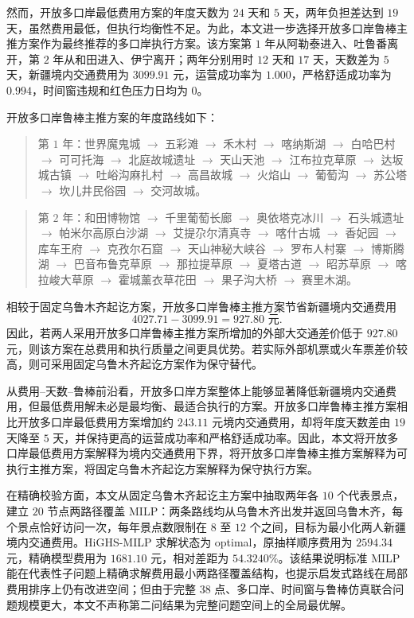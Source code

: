 \documentclass[UTF8,zihao=-4,a4paper]{ctexart}
\begin{document}
然而，开放多口岸最低费用方案的年度天数为 $24$ 天和 $5$ 天，两年负担差达到 $19$ 天，虽然费用最低，但执行均衡性不足。为此，本文进一步选择开放多口岸鲁棒主推方案作为最终推荐的多口岸执行方案。该方案第 $1$ 年从阿勒泰进入、吐鲁番离开，第 $2$ 年从和田进入、伊宁离开；两年分别用时 $12$ 天和 $17$ 天，天数差为 $5$ 天，新疆境内交通费用为 $3099.91$ 元，运营成功率为 $1.000$，严格舒适成功率为 $0.994$，时间窗违规和红色压力日均为 $0$。

开放多口岸鲁棒主推方案的年度路线如下：
\begin{quote}
\small
第 $1$ 年：世界魔鬼城 $\rightarrow$ 五彩滩 $\rightarrow$ 禾木村 $\rightarrow$ 喀纳斯湖 $\rightarrow$ 白哈巴村 $\rightarrow$ 可可托海 $\rightarrow$ 北庭故城遗址 $\rightarrow$ 天山天池 $\rightarrow$ 江布拉克草原 $\rightarrow$ 达坂城古镇 $\rightarrow$ 吐峪沟麻扎村 $\rightarrow$ 高昌故城 $\rightarrow$ 火焰山 $\rightarrow$ 葡萄沟 $\rightarrow$ 苏公塔 $\rightarrow$ 坎儿井民俗园 $\rightarrow$ 交河故城。
\end{quote}
\begin{quote}
\small
第 $2$ 年：和田博物馆 $\rightarrow$ 千里葡萄长廊 $\rightarrow$ 奥依塔克冰川 $\rightarrow$ 石头城遗址 $\rightarrow$ 帕米尔高原白沙湖 $\rightarrow$ 艾提尕尔清真寺 $\rightarrow$ 喀什古城 $\rightarrow$ 香妃园 $\rightarrow$ 库车王府 $\rightarrow$ 克孜尔石窟 $\rightarrow$ 天山神秘大峡谷 $\rightarrow$ 罗布人村寨 $\rightarrow$ 博斯腾湖 $\rightarrow$ 巴音布鲁克草原 $\rightarrow$ 那拉提草原 $\rightarrow$ 夏塔古道 $\rightarrow$ 昭苏草原 $\rightarrow$ 喀拉峻大草原 $\rightarrow$ 霍城薰衣草花田 $\rightarrow$ 果子沟大桥 $\rightarrow$ 赛里木湖。
\end{quote}

相较于固定乌鲁木齐起讫方案，开放多口岸鲁棒主推方案节省新疆境内交通费用
\[
4027.71-3099.91=927.80 \text{ 元}.
\]
因此，若两人采用开放多口岸鲁棒主推方案所增加的外部大交通差价低于 $927.80$ 元，则该方案在总费用和执行质量之间更具优势。若实际外部机票或火车票差价较高，则可采用固定乌鲁木齐起讫方案作为保守替代。

从费用--天数--鲁棒前沿看，开放多口岸方案整体上能够显著降低新疆境内交通费用，但最低费用解未必是最均衡、最适合执行的方案。开放多口岸鲁棒主推方案相比开放多口岸最低费用方案增加约 $243.11$ 元境内交通费用，却将年度天数差由 $19$ 天降至 $5$ 天，并保持更高的运营成功率和严格舒适成功率。因此，本文将开放多口岸最低费用方案解释为境内交通费用下界，将开放多口岸鲁棒主推方案解释为可执行主推方案，将固定乌鲁木齐起讫方案解释为保守执行方案。

在精确校验方面，本文从固定乌鲁木齐起讫主方案中抽取两年各 $10$ 个代表景点，建立 $20$ 节点两路径覆盖 MILP：两条路线均从乌鲁木齐出发并返回乌鲁木齐，每个景点恰好访问一次，每年景点数限制在 $8$ 至 $12$ 个之间，目标为最小化两人新疆境内交通费用。HiGHS-MILP 求解状态为 optimal，原抽样顺序费用为 $2594.34$ 元，精确模型费用为 $1681.10$ 元，相对差距为 $54.3240\%$。该结果说明标准 MILP 能在代表性子问题上精确求解费用最小两路径覆盖结构，也提示启发式路线在局部费用排序上仍有改进空间；但由于完整 $38$ 点、多口岸、时间窗与鲁棒仿真联合问题规模更大，本文不声称第二问结果为完整问题空间上的全局最优解。
\end{document}
